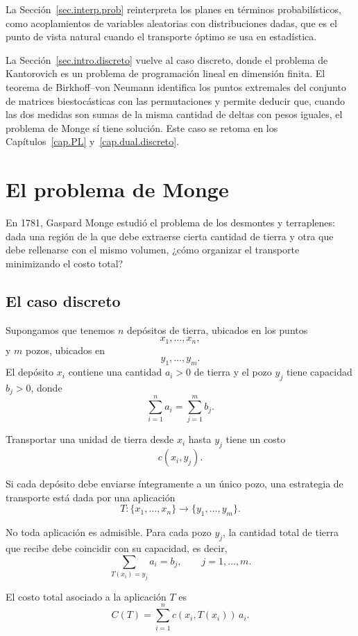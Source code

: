 \documentclass[12pt, a4paper]{amsbook}
\theoremstyle{remark}
\theoremstyle{definition}
\numberwithin{section}{chapter}
\numberwithin{subsection}{section}
\numberwithin{equation}{section}
\numberwithin{figure}{chapter}
\begin{document}
La Sección~\ref{sec.interp.prob} reinterpreta los planes en términos
probabilísticos, como acoplamientos de variables aleatorias con distribuciones
dadas, que es el punto de vista natural cuando el transporte óptimo se usa en
estadística.

La Sección~\ref{sec.intro.discreto} vuelve al caso discreto, donde el problema
de Kantorovich es un problema de programación lineal en dimensión finita. El
teorema de Birkhoff--von Neumann identifica los puntos extremales del conjunto
de matrices biestocásticas con las permutaciones y permite deducir que, cuando
las dos medidas son sumas de la misma cantidad de deltas con pesos iguales, el
problema de Monge sí tiene solución. Este caso se retoma en los
Capítulos~\ref{cap.PL} y~\ref{cap.dual.discreto}.

\section{El problema de Monge}\label{sec.monge}

En 1781, Gaspard Monge estudió el problema de los desmontes y terraplenes: dada una región de la que debe extraerse cierta cantidad de tierra y otra que debe rellenarse con el mismo volumen, ¿cómo organizar el transporte minimizando el costo total?

\subsection{El caso discreto}

Supongamos que tenemos \(n\) depósitos de tierra, ubicados en los puntos
\[
x_1,\dots,x_n,
\]
y \(m\) pozos, ubicados en
\[
y_1,\dots,y_m.
\]
El depósito \(x_i\) contiene una cantidad \(a_i>0\) de tierra y el pozo \(y_j\) tiene capacidad \(b_j>0\), donde
\[
\sum_{i=1}^n a_i=\sum_{j=1}^m b_j.
\]

Transportar una unidad de tierra desde \(x_i\) hasta \(y_j\) tiene un costo
\[
c(x_i,y_j).
\]

Si cada depósito debe enviarse íntegramente a un único pozo, una estrategia de transporte está dada por una aplicación
\[
T\colon \{x_1,\dots,x_n\}\longrightarrow \{y_1,\dots,y_m\}.
\]

No toda aplicación es admisible. Para cada pozo \(y_j\), la cantidad total de tierra que recibe debe coincidir con su capacidad, es decir,
\[
\sum_{T(x_i)=y_j} a_i=b_j,
\qquad j=1,\dots,m.
\]

El costo total asociado a la aplicación \(T\) es
\[
C(T)=\sum_{i=1}^n c(x_i,T(x_i))\,a_i.
\]
\end{document}
